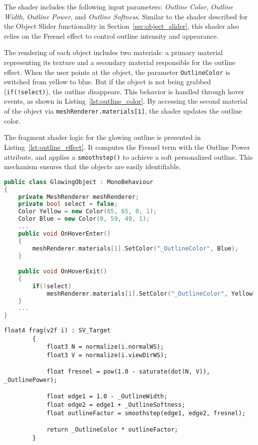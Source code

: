 The shader includes the following input parameters: \emph{Outline Color}, \emph{Outline Width}, \emph{Outline Power}, and \emph{Outline Softness}.  
Similar to the shader described for the Object Slider functionality in Section~\ref{sec:object_slider}, this shader also relies on the Fresnel effect to control outline intensity and appearance.  

The rendering of each object includes two materials: a primary material representing its texture and a secondary material responsible for the outline effect.
When the user points at the object, the parameter \texttt{OutlineColor} is switched from yellow to blue. But if the object is not being grabbed (\texttt{if(!select)}), the outline disappears. 
This behavior is handled through hover events, as shown in Listing~\ref{lst:outline_color}. 
By accessing the second material of the object via \texttt{meshRenderer.materials[1]}, the shader updates the outline color.  

The fragment shader logic for the glowing outline is presented in Listing~\ref{lst:outline_effect}. 
It computes the Fresnel term with the Outline Power attribute, and applies a \texttt{smoothstep()} to achieve a soft personalized outline.  
This mechanism ensures that the objects are easily identifiable. 


\begin{lstlisting}[language=C++, caption={Partial class with Outline Color changed when the object is Hovered.}, label={lst:outline_color}]
    public class GlowingObject : MonoBehaviour
{
    private MeshRenderer meshRenderer;
    private bool select = false;
    Color Yellow = new Color(65, 65, 0, 1);
    Color Blue = new Color(0, 59, 49, 1);
    ...
    public void OnHoverEnter()
    {
        meshRenderer.materials[1].SetColor("_OutlineColor", Blue);
    }

    public void OnHoverExit()
    {
        if(!select)
            meshRenderer.materials[1].SetColor("_OutlineColor", Yellow);
    }
    ...
}
\end{lstlisting}


\begin{lstlisting}[language=HLSL, caption={Partial Fragment shader for creating an outline effect to the object.}, label={lst:outline_effect}]
        float4 frag(v2f i) : SV_Target
        {
            float3 N = normalize(i.normalWS);
            float3 V = normalize(i.viewDirWS);

            float fresnel = pow(1.0 - saturate(dot(N, V)), _OutlinePower);

            float edge1 = 1.0 - _OutlineWidth;
            float edge2 = edge1 + _OutlineSoftness;
            float outlineFactor = smoothstep(edge1, edge2, fresnel);

            return _OutlineColor * outlineFactor;
        }
\end{lstlisting}

